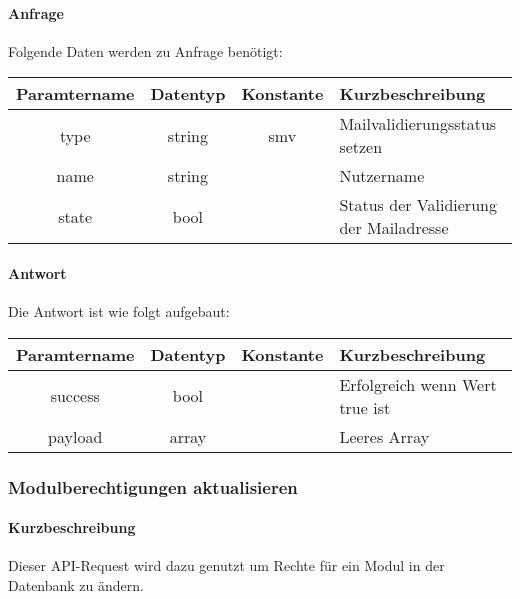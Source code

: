 \paragraph{Anfrage}Folgende Daten werden zu Anfrage benötigt:
\begin{table}[H]
	\begin{tabular}{|c|c|c|p{6.5cm}|}
		\hline
		\textbf{Paramtername} & \textbf{Datentyp} & \textbf{Konstante} & \textbf{Kurzbeschreibung}                                                                                               \\ \hline
		type                & string            & smv                & Mailvalidierungsstatus setzen \\ \hline
		name                & string            &                    & Nutzername \\ \hline
		state               & bool              &                    & Status der Validierung der Mailadresse \\ \hline
	\end{tabular}
\end{table}
\paragraph{Antwort}Die Antwort ist wie folgt aufgebaut:
\begin{table}[H]
	\begin{tabular}{|c|c|c|p{6.5cm}|}
		\hline
		\textbf{Paramtername} & \textbf{Datentyp} & \textbf{Konstante} & \textbf{Kurzbeschreibung}            \\ \hline                
		success             & bool             &                 & Erfolgreich wenn Wert {\glqq true\grqq} ist \\ \hline
		payload             & array            &                 & Leeres Array \\ \hline
	\end{tabular}
\end{table}
\subsubsection{Modulberechtigungen aktualisieren}
\paragraph{Kurzbeschreibung}Dieser API-Request wird dazu genutzt um Rechte für ein Modul in der Datenbank zu ändern.
